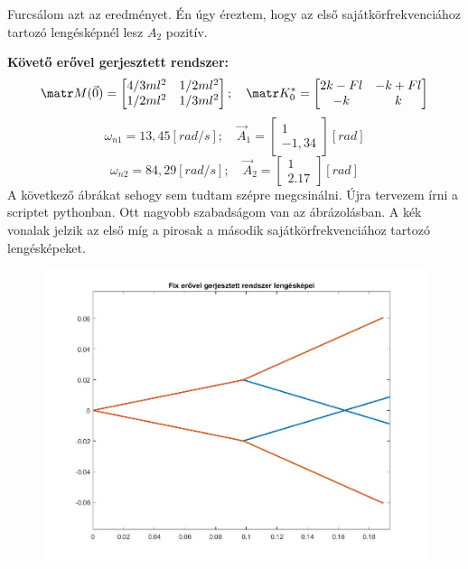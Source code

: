 \documentclass[12pt,twoside]{article}
\begin{document}
{\color{blue} Furcsálom azt az eredményet. Én úgy éreztem, hogy az első sajátkörfrekvenciához tartozó lengésképnél lesz $A_2$ pozitív.}

\textbf{Követő erővel gerjesztett rendszer:}
\begin{equation} \label{eq:Newton}
\matr M(\vec 0)=
\begin{bmatrix}
4/3 ml^2 & 1/2 ml^2 \\
1/2 ml^2 & 1/3 ml^2
\end{bmatrix}; \quad
\matr K_0^* =
\begin{bmatrix}
2k-Fl & -k+Fl \\
-k & k
\end{bmatrix}
\end{equation}
\begin{equation} \label{eq:Newton}
\omega_{n1}=13,45 [rad/s];\quad
\vec A_1=
\begin{bmatrix}
1 \\
-1,34
\end{bmatrix}[rad]
\end{equation}
\begin{equation} \label{eq:Newton}
\omega_{n2}=84,29 [rad/s];\quad
\vec A_2=
\begin{bmatrix}
1 \\
2.17
\end{bmatrix}[rad]
\end{equation}
{\color{blue} A következő ábrákat sehogy sem tudtam szépre megcsinálni. Újra tervezem írni a scriptet pythonban. Ott nagyobb szabadságom van az ábrázolásban. A kék vonalak jelzik az első míg a pirosak a második sajátkörfrekvenciához tartozó lengésképeket.}
\begin{figure}[H]
\center
\includegraphics[scale=0.4]{lengésképek/fix_ero_lengeskep.jpg}
\end{figure}
\end{document}
